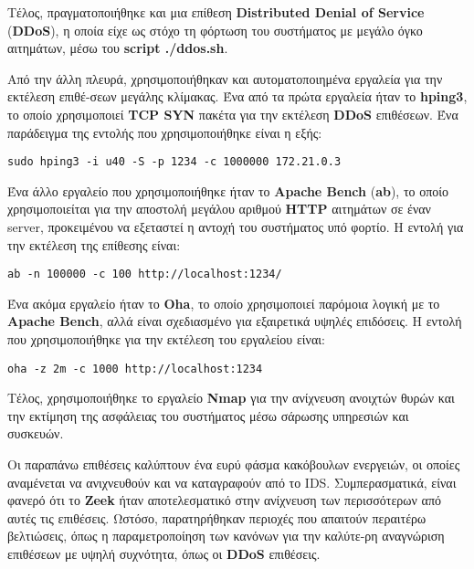 Τέλος, πραγματοποιήθηκε και μια επίθεση \textbf{Distributed Denial of Service} (\textbf{DDoS}), η οποία είχε ως στόχο τη φόρτωση του συστήματος με μεγάλο όγκο αιτημάτων, μέσω του \textbf{script ./ddos.sh}.

Από την άλλη πλευρά, χρησιμοποιήθηκαν και αυτοματοποιημένα εργαλεία για την εκτέλεση επιθέ-σεων μεγάλης κλίμακας. Ένα από τα πρώτα εργαλεία ήταν το \textbf{hping3}, το οποίο χρησιμοποιεί \textbf{TCP SYN} πακέτα για την εκτέλεση \textbf{DDoS} επιθέσεων. Ένα παράδειγμα της εντολής που χρησιμοποιήθηκε είναι η εξής:
\begin{lstlisting}
sudo hping3 -i u40 -S -p 1234 -c 1000000 172.21.0.3
\end{lstlisting}

Ένα άλλο εργαλείο που χρησιμοποιήθηκε ήταν το \textbf{Apache Bench} (\textbf{ab}), το οποίο χρησιμοποιείται για την αποστολή μεγάλου αριθμού \textbf{HTTP} αιτημάτων σε έναν server, προκειμένου να εξεταστεί η αντοχή του συστήματος υπό φορτίο. Η εντολή για την εκτέλεση της επίθεσης είναι:
\begin{lstlisting}
ab -n 100000 -c 100 http://localhost:1234/
\end{lstlisting}

Ένα ακόμα εργαλείο ήταν το \textbf{Oha}, το οποίο χρησιμοποιεί παρόμοια λογική με το \textbf{Apache Bench}, αλλά είναι σχεδιασμένο για εξαιρετικά υψηλές επιδόσεις. Η εντολή που χρησιμοποιήθηκε για την εκτέλεση του εργαλείου είναι:
\begin{lstlisting}
oha -z 2m -c 1000 http://localhost:1234
\end{lstlisting}

Τέλος, χρησιμοποιήθηκε το εργαλείο \textbf{Nmap} για την ανίχνευση ανοιχτών θυρών και την εκτίμηση της ασφάλειας του συστήματος μέσω σάρωσης υπηρεσιών και συσκευών.

Οι παραπάνω επιθέσεις καλύπτουν ένα ευρύ φάσμα κακόβουλων ενεργειών, οι οποίες αναμένεται να ανιχνευθούν και να καταγραφούν από το IDS. Συμπερασματικά, είναι φανερό ότι το \textbf{Zeek} ήταν αποτελεσματικό στην ανίχνευση των περισσότερων από αυτές τις επιθέσεις. Ωστόσο, παρατηρήθηκαν περιοχές που απαιτούν περαιτέρω βελτιώσεις, όπως η παραμετροποίηση των κανόνων για την καλύτε-ρη αναγνώριση επιθέσεων με υψηλή συχνότητα, όπως οι \textbf{DDoS} επιθέσεις.
